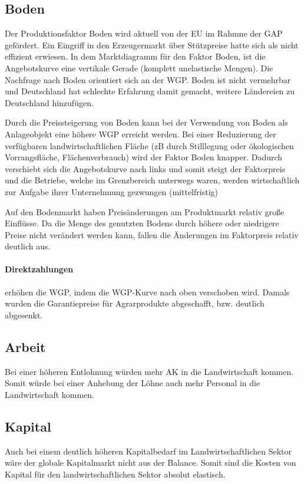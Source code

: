 \documentclass[11pt]{scrartcl}
\begin{document}
\subsection{Boden}
Der Produktionsfaktor Boden wird aktuell von der \ac{EU} im Rahmne der \ac{GAP} gefördert.
Ein Eingriff in den Erzeugermarkt über Stützpreise hatte sich als nicht effizient erwiesen.
In dem Marktdiagramm für den Faktor Boden, ist die Angebotskurve eine vertikale Gerade (komplett unelastische Mengen).
Die Nachfrage nach Boden orientiert sich an der \ac{WGP}.
Boden ist nicht vermehrbar und Deutschland hat schlechte Erfahrung damit gemacht, weitere Ländereien zu Deutschland hinzufügen.

Durch die Preissteigerung von Boden kann bei der Verwendung von Boden als \glqq Anlageobjekt\grqq{} eine höhere \ac{WGP} erreicht werden.
Bei einer Reduzierung der verfügbaren landwirtschaftlichen Fläche (zB durch Stilllegung oder ökologischen Vorrangsfläche, \glqq Flächenverbrauch\grqq{}) wird der Faktor Boden knapper.
Dadurch verschiebt sich die Angebotskurve nach links und somit steigt der Faktorpreis und die Betriebe, welche im Grenzbereich unterwegs waren, werden wirtschaftlich zur Aufgabe ihrer Unternehmung gezwungen (mittelfristig)

Auf den Bodenmarkt haben Preisänderungen am Produktmarkt relativ große Einflüsse.
Da die Menge des genutzten Bodens durch höhere oder niedrigere Preise nicht verändert werden kann, fallen die Änderungen im Faktorpreis relativ deutlich aus.

\paragraph{Direktzahlungen} erhöhen die \ac{WGP}, indem die \ac{WGP}-Kurve nach oben verschoben wird.
Damals wurden die Garantiepreise für Agrarprodukte abgeschafft, bzw. deutlich abgesenkt.

\subsection{Arbeit}
Bei einer höheren Entlohnung würden mehr \ac{AK} in die Landwirtschaft kommen.
Somit würde bei einer Anhebung der Löhne auch mehr Personal in die Landwirtschaft kommen.


\subsection{Kapital}
Auch bei einem deutlich höheren Kapitalbedarf im Landwirtschaftlichen Sektor wäre der globale Kapitalmarkt nicht aus der Balance.
Somit sind die Kosten von Kapital für den landwirtschaftlichen Sektor absolut elastisch.




\end{document}
